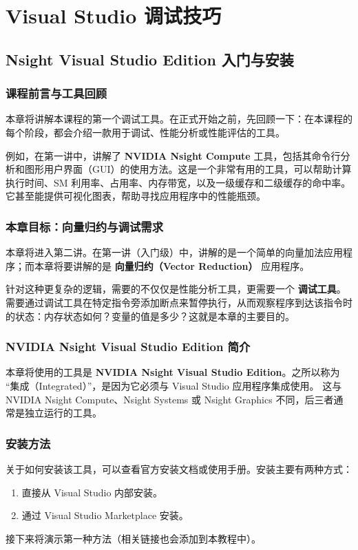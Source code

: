 \section{Visual Studio 调试技巧}

\subsection{Nsight Visual Studio Edition 入门与安装}

\subsubsection{课程前言与工具回顾}
本章将讲解本课程的第一个调试工具。在正式开始之前，先回顾一下：在本课程的每个阶段，都会介绍一款用于调试、性能分析或性能评估的工具。

例如，在第一讲中，讲解了 \textbf{NVIDIA Nsight Compute} 工具，包括其命令行分析和图形用户界面（GUI）的使用方法。这是一个非常有用的工具，可以帮助计算执行时间、SM 利用率、占用率、内存带宽，以及一级缓存和二级缓存的命中率。它甚至能提供可视化图表，帮助寻找应用程序中的性能瓶颈。

\subsubsection{本章目标：向量归约与调试需求}
本章将进入第二讲。在第一讲（入门级）中，讲解的是一个简单的向量加法应用程序；而本章将要讲解的是 \textbf{向量归约（Vector Reduction）} 应用程序。

针对这种更复杂的逻辑，需要的不仅仅是性能分析工具，更需要一个 \textbf{调试工具}。需要通过调试工具在特定指令旁添加断点来暂停执行，从而观察程序到达该指令时的状态：内存状态如何？变量的值是多少？这就是本章的主要目的。

\subsubsection{NVIDIA Nsight Visual Studio Edition 简介}
本章将使用的工具是 \textbf{NVIDIA Nsight Visual Studio Edition}。之所以称为
“集成（Integrated）”，是因为它必须与 Visual Studio 应用程序集成使用。
这与 NVIDIA Nsight Compute、Nsight Systems 或 Nsight Graphics 不同，后三者通常是独立运行的工具。

\subsubsection{安装方法}
关于如何安装该工具，可以查看官方安装文档或使用手册。安装主要有两种方式：
\begin{enumerate}
    \item 直接从 Visual Studio 内部安装。
    \item 通过 Visual Studio Marketplace 安装。
\end{enumerate}
接下来将演示第一种方法（相关链接也会添加到本教程中）。

